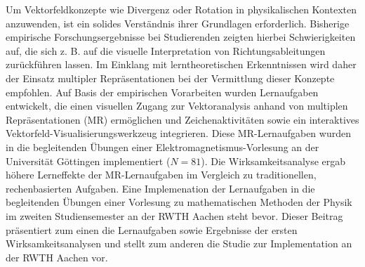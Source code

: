 \documentclass{scdpg}
\begin{document}
\begin{scAbstract}
{}
\scBeginText
Um Vektorfeldkonzepte wie Divergenz oder Rotation in physikalischen Kontexten anzuwenden, ist ein solides Verständnis ihrer Grundlagen erforderlich. Bisherige empirische Forschungsergebnisse bei Studierenden zeigten hierbei Schwierigkeiten auf, die sich z. B. auf die visuelle Interpretation von Richtungsableitungen zurückführen lassen. Im Einklang mit lerntheoretischen Erkenntnissen wird daher der Einsatz multipler Repräsentationen bei der Vermittlung dieser Konzepte empfohlen. Auf Basis der empirischen Vorarbeiten wurden Lernaufgaben entwickelt, die einen visuellen Zugang zur Vektoranalysis anhand von multiplen Repräsentationen (MR) ermöglichen und Zeichenaktivitäten sowie ein interaktives Vektorfeld-Visualisierungswerkzeug integrieren. Diese MR-Lernaufgaben wurden in die begleitenden Übungen einer Elektromagnetismus-Vorlesung an der Universität Göttingen implementiert ($N=81$). Die Wirksamkeitsanalyse ergab höhere Lerneffekte der MR-Lernaufgaben im Vergleich zu traditionellen, rechenbasierten Aufgaben. Eine Implemenation der Lernaufgaben in die begleitenden Übungen einer Vorlesung zu mathematischen Methoden der Physik im zweiten Studiensemester an der RWTH Aachen steht bevor. Dieser Beitrag präsentiert zum einen die Lernaufgaben sowie Ergebnisse der ersten Wirksamkeitsanalysen und stellt zum anderen die Studie zur Implementation an der RWTH Aachen vor.
\scEndText
{}
\end{scAbstract}
\end{document}

